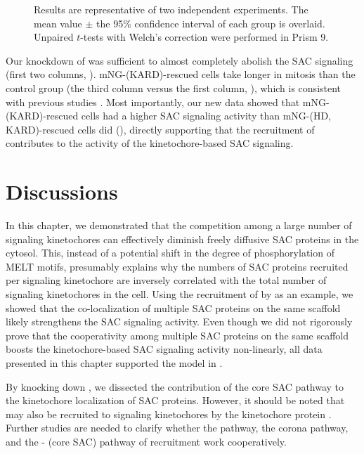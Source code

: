 \begin{figure}
Results are representative of two independent experiments. The mean value $\pm$ the 95\% confidence interval of each group is overlaid. Unpaired $t$-tests with Welch's correction were performed in Prism 9.
\end{figure}

Our knockdown of  was sufficient to almost completely abolish the SAC signaling (first two columns, ). mNG-(\textDelta{}KARD)-rescued cells take longer in mitosis than the control group (the third column versus the first column, ), which is consistent with previous studies \cite{PP2A-B56, BUBR1-L669A+I672A}. Most importantly, our new data showed that mNG-(\textDelta{}KARD)-rescued cells had a higher SAC signaling activity than mNG-(\textDelta{}HD, \textDelta{}KARD)-rescued cells did (), directly supporting that the recruitment of   contributes to the activity of the kinetochore-based SAC signaling.

\section{Discussions}
\label{Chapter3Discussions}

In this chapter, we demonstrated that the competition among a large number of signaling kinetochores can effectively diminish freely diffusive SAC proteins in the cytosol. This, instead of a potential shift in the degree of phosphorylation of MELT motifs, presumably explains why the numbers of SAC proteins recruited per signaling kinetochore are inversely correlated with the total number of signaling kinetochores in the cell. Using the recruitment of  by  as an example, we showed that the co-localization of multiple SAC proteins on the same  scaffold likely strengthens the SAC signaling activity. Even though we did not rigorously prove that the cooperativity among multiple SAC proteins on the same  scaffold boosts the kinetochore-based SAC signaling activity non-linearly, all data presented in this chapter supported the model in .

By knocking down , we dissected the contribution of the core SAC pathway to the kinetochore localization of SAC proteins. However, it should be noted that  may also be recruited to signaling kinetochores by the kinetochore protein  \cite{MIS12-CEP57-MAD1-MAD2}. Further studies are needed to clarify whether the  pathway, the corona pathway, and the - (core SAC) pathway of  recruitment work cooperatively.

